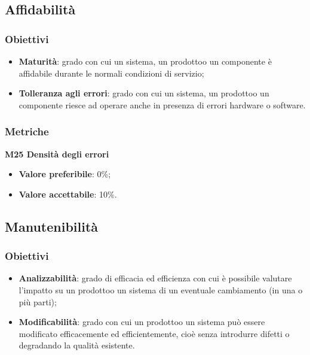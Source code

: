     \subsection{Affidabilità}
        \subsubsection{Obiettivi}
            \begin{itemize}
                \item \textbf{Maturità}: grado con cui un sistema, un prodotto\glosp o un componente è affidabile durante le normali condizioni di servizio;
                \item \textbf{Tolleranza agli errori}: grado con cui un sistema, un prodotto\glosp o un componente riesce ad operare anche in presenza di errori hardware o software.
            \end{itemize}
        \subsubsection{Metriche}
            \textbf{M25 Densità degli errori}
                \begin{itemize}
                    \item \textbf{Valore preferibile}: 0\%;
                    \item \textbf{Valore accettabile}: 10\%.
                \end{itemize}
    \subsection{Manutenibilità}
        \subsubsection{Obiettivi}
        \begin{itemize}
            \item \textbf{Analizzabilità}: grado di efficacia ed efficienza con cui è possibile valutare l'impatto su un prodotto\glosp o un sistema di un eventuale cambiamento (in una o più parti);
            \item \textbf{Modificabilità}: grado con cui un prodotto\glosp o un sistema può essere modificato efficacemente ed efficientemente, cioè senza introdurre difetti o degradando la qualità esistente.
        \end{itemize}
